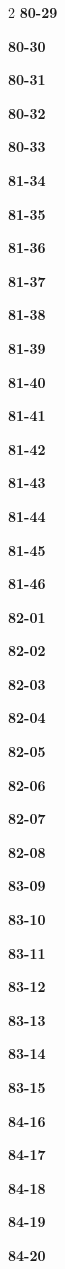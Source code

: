 \documentclass[10pt,a4paper]{article}
\begin{document}
\begin{multicols}{2}
\noindent\textbf{80-29}\ \par
\noindent\textbf{80-30}\ \par
\noindent\textbf{80-31}\ \par
\noindent\textbf{80-32}\ \par
\noindent\textbf{80-33}\ \par
\noindent\textbf{81-34}\ \par
\noindent\textbf{81-35}\ \par
\noindent\textbf{81-36}\ \par
\noindent\textbf{81-37}\ \par
\noindent\textbf{81-38}\ \par
\noindent\textbf{81-39}\ \par
\noindent\textbf{81-40}\ \par
\noindent\textbf{81-41}\ \par
\noindent\textbf{81-42}\ \par
\noindent\textbf{81-43}\ \par
\noindent\textbf{81-44}\ \par
\noindent\textbf{81-45}\ \par
\noindent\textbf{81-46}\ \par
\noindent\textbf{82-01}\ \par
\noindent\textbf{82-02}\ \par
\noindent\textbf{82-03}\ \par
\noindent\textbf{82-04}\ \par
\noindent\textbf{82-05}\ \par
\noindent\textbf{82-06}\ \par
\noindent\textbf{82-07}\ \par
\noindent\textbf{82-08}\ \par
\noindent\textbf{83-09}\ \par
\noindent\textbf{83-10}\ \par
\noindent\textbf{83-11}\ \par
\noindent\textbf{83-12}\ \par
\noindent\textbf{83-13}\ \par
\noindent\textbf{83-14}\ \par
\noindent\textbf{83-15}\ \par
\noindent\textbf{84-16}\ \par
\noindent\textbf{84-17}\ \par
\noindent\textbf{84-18}\ \par
\noindent\textbf{84-19}\ \par
\noindent\textbf{84-20}\ \par

\end{multicols}
\end{document}
